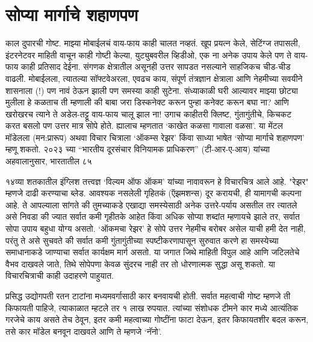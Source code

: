 \chapter{सोप्या मार्गाचे शहाणपण}

काल दुपारची गोष्ट. माझ्या मोबाईलचं वाय-फाय काही चालत नव्हतं. खूप प्रयत्न केले, सेटिंग्ज तपासली, इंटरनेटवर माहिती वाचून काही गोष्टी केल्या, युट्युबवरील व्हिडीओ, एक ना अनेक उपाय केले पण ते वाय-फाय काही प्रतिसाद देईना. संगणक क्षेत्रातील असूनही उत्तर सापडत नसल्याने साहजिकच चीड-चीड वाढली. मोबाईलला, त्यातल्या सॉफ्टवेअरला, एवढच काय, संपूर्ण तंत्रज्ञान क्षेत्राला आणि नेहमीच्या सवयीने शासनाला (!) पण नावं  ठेऊन झाली पण समस्या काही सुटेना. संध्याकाळी घरी आल्यावर माझ्या छोट्या मुलीला हे कळताच ती म्हणाली की बाबा जरा डिस्कनेक्ट करून पुन्हा कनेक्ट करून बघा ना? आणि खरोखरच त्याने ते अडेल-तट्टू वाय-फाय चालू झाल ना! उगाच काहीतरी क्लिष्ट, गुंतागुंतीचे, किचकट करत बसलो पण उत्तर मात्र सोपे होते. ह्यालाच म्हणतात ‘काखेत कळसा गावाला वळसा’. या मेंटल मॉडेलला (मन:प्रारूप) अथवा विचार चित्राला ‘ऑकम्स रेझर’ किंवा साध्या भाषेत ‘सोप्या मार्गाचे शहाणपण’ म्हणू शकतो. २०२३ च्या “भारतीय दूरसंचार विनियामक प्राधिकरण” (टी-आर-ए-आय)  यांच्या अहवालानुसार, भारतातील ८५%

१४व्या शतकातील इंग्लिश तत्त्वज्ञ ‘विल्यम ऑफ ऑकम’ यांच्या नावावरून हे विचारचित्र आले आहे. "रेझर" म्हणजे दाढी करण्याचा ब्लेड. आवश्यक  नसलेली गृहितकं (ऍझमशन्स) दूर करायची, ही यामागची कल्पना आहे. ते आपल्याला सांगते की तुमच्याकडे एखाद्या समस्येसाठी अनेक उत्तरे-पर्याय असतील तर त्यातले असे निवडा की ज्यात सर्वात कमी गृहीतके आहेत किंवा अधिक सोप्या शब्दांत म्हणायचे झाले तर, सर्वात सोपा उपाय बहुधा योग्य असतो. ‘ऑकमचा रेझर’ हे सोपे उत्तर नेहमीच बरोबर असेल याची हमी देत नाही, परंतु ते असे सुचवते की सर्वात कमी गुंतागुंतीच्या स्पष्टीकरणापासून सुरुवात करणे हा समस्येच्या समाधानाकडे जाण्याचा सर्वात कार्यक्षम मार्ग असतो. या जगात जिथे माहिती विपुल आहे आणि जटिलतेचे वैभव दाखवले जाते, तिथे सोपेपणा केवळ सुंदरच नाही तर तो धोरणात्मक सुद्धा असू शकतो. या विचारचित्राची काही उदाहरणे पाहुयात. 

प्रसिद्ध उद्योगपती रतन टाटांना मध्यमवर्गासाठी कार बनवायची होती. सर्वात महत्वाची गोष्ट म्हणजे ती किफायती पाहिजे, त्याकाळात म्हटले तर १ लाख रुपयात. त्यांच्या संशोधक टीमने कार मध्ये आत्यंतिक गरजेचे काय असते तेच ठेवून, इतर कमी महत्वाच्या गोष्टींना फाटा देऊन, इतर किफायतशीर बदल करून, तसे कार मॉडेल बनवून दाखवले आणि ते म्हणजे ‘नॅनो’. 

